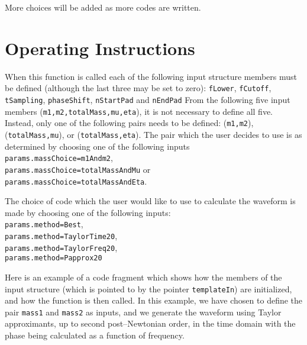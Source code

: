\documentclass[12pt]{article}
\begin{document}
\vspace{5mm}
More choices will be added as more codes are written.



\section{Operating Instructions}

When this function is called each of the following input structure members must be defined (although the last three may be set to zero):
\texttt{fLower}, \texttt{fCutoff}, \texttt{tSampling}, \texttt{phaseShift}, \texttt{nStartPad} and \texttt{nEndPad}
From the following five input members (\texttt{m1,m2,totalMass,mu,eta}), it is not necessary to define all five. Instead, only  one of the following pairs needs to be defined: (\texttt{m1,m2}), (\texttt{totalMass,mu}), or (\texttt{totalMass,eta}). The pair which the user decides to use is as determined by choosing one of the following inputs \\ \texttt{params.massChoice=m1Andm2}, \\ \texttt{params.massChoice=totalMassAndMu} or \\ \texttt{params.massChoice=totalMassAndEta}.

The choice of code which the user would like to use to calculate the waveform is made by choosing one of the following inputs:\\
\texttt{params.method=Best}, \\
\texttt{params.method=TaylorTime20}, \\
\texttt{params.method=TaylorFreq20}, \\
\texttt{params.method=Papprox20}


Here is an example of a code fragment which shows how the members of the input structure (which is pointed to by the pointer \texttt{templateIn}) are initialized, and how the function is then called. In this example, we have chosen to define the pair \texttt{mass1} and \texttt{mass2} as inputs, and we generate the waveform using Taylor approximants, up to second post--Newtonian order, in the time domain with the phase being calculated as a function of frequency.


\vspace{5mm}
\end{document}
